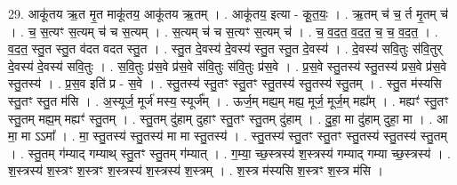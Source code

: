 \documentclass[17pt]{extarticle}
\begin{document}
29. आकू॑तय ऋ॒त मृ॒त माकू॑तय॒ आकू॑तय ऋ॒तम् । . आकू॑तय॒ इत्या - कू॒त॒यः॒ । . ऋ॒तम् च॑ च॒ र्त मृ॒तम् च॑ । . च॒ स॒त्यꣳ स॒त्यम् च॑ च स॒त्यम् । . स॒त्यम् च॑ च स॒त्यꣳ स॒त्यम् च॑ । . च॒ व॒द॒त॒ व॒द॒त॒ च॒ च॒ व॒द॒त॒ । . व॒द॒त॒ स्तु॒त स्तु॒त व॑दत वदत स्तु॒त । . स्तु॒त दे॒वस्य॑ दे॒वस्य॑ स्तु॒त स्तु॒त दे॒वस्य॑ । . दे॒वस्य॑ सवि॒तुः स॑वि॒तुर् दे॒वस्य॑ दे॒वस्य॑ सवि॒तुः । . स॒वि॒तुः प्र॑स॒वे प्र॑स॒वे स॑वि॒तुः स॑वि॒तुः प्र॑स॒वे । . प्र॒स॒वे स्तु॒तस्य॑ स्तु॒तस्य॑ प्रस॒वे प्र॑स॒वे स्तु॒तस्य॑ । . प्र॒स॒व इति॑ प्र - स॒वे । . स्तु॒तस्य॑ स्तु॒तꣳ स्तु॒तꣳ स्तु॒तस्य॑ स्तु॒तस्य॑ स्तु॒तम् । . स्तु॒त म॑स्यसि स्तु॒तꣳ स्तु॒त म॑सि । . अ॒स्यूर्ज॒ मूर्ज॑ मस्य॒ स्यूर्ज᳚म् । . ऊर्ज॒म् मह्य॒म् मह्य॒ मूर्ज॒ मूर्ज॒म् मह्य᳚म् । . मह्यꣳ॑ स्तु॒तꣳ स्तु॒तम् मह्य॒म् मह्यꣳ॑ स्तु॒तम् । . स्तु॒तम् दु॑हाम् दुहाꣳ स्तु॒तꣳ स्तु॒तम् दु॑हाम् । . दु॒हा॒ मा दु॑हाम् दुहा॒ मा । . आ मा॒ मा ऽऽमा᳚ । . मा॒ स्तु॒तस्य॑ स्तु॒तस्य॑ मा मा स्तु॒तस्य॑ । . स्तु॒तस्य॑ स्तु॒तꣳ स्तु॒तꣳ स्तु॒तस्य॑ स्तु॒तस्य॑ स्तु॒तम् । . स्तु॒तम् ग॑म्याद् गम्याथ् स्तु॒तꣳ स्तु॒तम् ग॑म्यात् । . ग॒म्या॒ च्छ॒स्त्रस्य॑ श॒स्त्रस्य॑ गम्याद् गम्या च्छ॒स्त्रस्य॑ । . श॒स्त्रस्य॑ श॒स्त्रꣳ श॒स्त्रꣳ श॒स्त्रस्य॑ श॒स्त्रस्य॑ श॒स्त्रम् । . श॒स्त्र म॑स्यसि श॒स्त्रꣳ श॒स्त्र म॑सि । \newline

\end{document}
